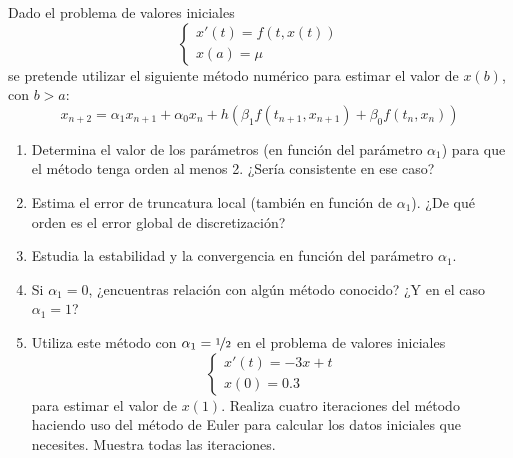 \begin{ejercicio}
    Dado el problema de valores iniciales
    \begin{equation*}
        \begin{cases}
            x'(t) = f(t, x(t)) \\
            x(a) = \mu
        \end{cases}
    \end{equation*}
    se pretende utilizar el siguiente método numérico para estimar el valor de $x(b)$, con $b > a$:
    \begin{equation*}
        x_{n+2} = \alpha_1 x_{n+1} + \alpha_0 x_n + h \left( \beta_1 f(t_{n+1}, x_{n+1}) + \beta_0 f(t_n, x_n) \right)
    \end{equation*}
    \begin{enumerate}
        \item Determina el valor de los parámetros (en función del parámetro $\alpha_1$) para que el método tenga orden al menos 2. ¿Sería consistente en ese caso?
        \item Estima el error de truncatura local (también en función de $\alpha_1$). ¿De qué orden es el error global de discretización?
        \item Estudia la estabilidad y la convergencia en función del parámetro $\alpha_1$.
        \item Si $\alpha_1 = 0$, ¿encuentras relación con algún método conocido? ¿Y en el caso $\alpha_1 = 1$?
        \item Utiliza este método con $\alpha_1 = \nicefrac{1}{2}$ en el problema de valores iniciales
            \begin{equation*}
                \begin{cases}
                    x'(t) = -3x + t \\
                    x(0) = 0.3
                \end{cases}
            \end{equation*}
            para estimar el valor de $x(1)$. Realiza cuatro iteraciones del método haciendo uso del método de Euler para calcular los datos iniciales que necesites. Muestra todas las iteraciones.
    \end{enumerate}
\end{ejercicio}

